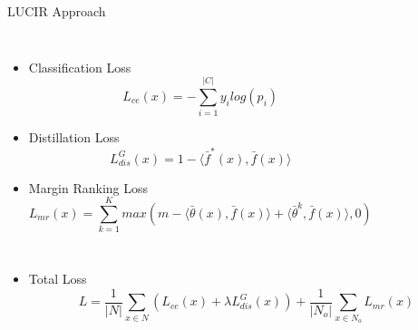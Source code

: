 \documentclass[aspectratio=169, xcolor=dvipsnames]{beamer}
\begin{document}
\begin{frame}{LUCIR Approach}
\begin{columns}
      \vspace{-0.5cm}
      \begin{itemize}
            \item Classification Loss\\
            \vspace{-0.5cm}
            {\small
            \begin{equation}
            L_{ce}(x) = - \sum^{|C|}_{i=1} y_i log (p_i)
            \end{equation}
            }
            \item Distillation Loss\\
            \vspace{-0.25cm}
            {\small
            \begin{equation}
            L^G_{dis}(x) = 1 - \langle \bar{f}^*(x), \bar{f}(x) \rangle
            \end{equation}
            }
            \item Margin Ranking Loss\\
            \vspace{-0.5cm}
            {\small
            \begin{equation}
            L_{mr}(x) = \sum^{K}_{k=1} max(m - \langle \bar{\theta}(x), \bar{f}(x) \rangle + \langle \bar{\theta}^k, \bar{f}(x) \rangle, 0)
            \end{equation}
            }
      \end{itemize}
      \end{columns}
      \begin{itemize}
      \item Total Loss\\
      \vspace{-0.5cm}
            {\small
            \begin{equation}
            L = \frac{1}{|N|} \sum_{x\in{N}} {(L_{ce}(x) + \lambda L^G_{dis}(x))} + \frac{1}{|N_o|} \sum_{x\in{N_o}} {L_{mr}(x)}
            \end{equation}
            }
      \end{itemize}
\end{frame}
\end{document}
